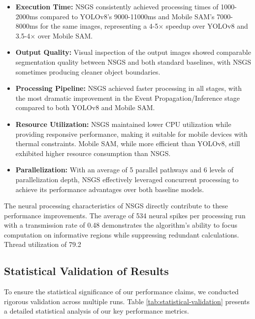 \documentclass[conference]{IEEEtran}
\begin{document}
\begin{itemize}
    \item \textbf{Execution Time:} NSGS consistently achieved processing times of 1000-2000ms compared to YOLOv8's 9000-11000ms and Mobile SAM's 7000-8000ms for the same images, representing a 4-5× speedup over YOLOv8 and 3.5-4× over Mobile SAM.
    
    \item \textbf{Output Quality:} Visual inspection of the output images showed comparable segmentation quality between NSGS and both standard baselines, with NSGS sometimes producing cleaner object boundaries.
    
    \item \textbf{Processing Pipeline:} NSGS achieved faster processing in all stages, with the most dramatic improvement in the Event Propagation/Inference stage compared to both YOLOv8 and Mobile SAM.
    
    \item \textbf{Resource Utilization:} NSGS maintained lower CPU utilization while providing responsive performance, making it suitable for mobile devices with thermal constraints. Mobile SAM, while more efficient than YOLOv8, still exhibited higher resource consumption than NSGS.
    
    \item \textbf{Parallelization:} With an average of 5 parallel pathways and 6 levels of parallelization depth, NSGS effectively leveraged concurrent processing to achieve its performance advantages over both baseline models.
\end{itemize}

The neural processing characteristics of NSGS directly contribute to these performance improvements. The average of 534 neural spikes per processing run with a transmission rate of 0.48 demonstrates the algorithm's ability to focus computation on informative regions while suppressing redundant calculations. Thread utilization of 79.2%

\subsection{Statistical Validation of Results}
To ensure the statistical significance of our performance claims, we conducted rigorous validation across multiple runs. Table \ref{tab:statistical-validation} presents a detailed statistical analysis of our key performance metrics.
\end{document}
